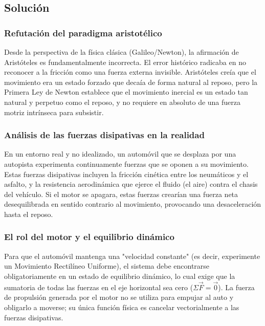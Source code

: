 \documentclass[12pt, a4paper]{article}
\begin{document}
\subsection*{Solución}

\subsubsection*{Refutación del paradigma aristotélico}
Desde la perspectiva de la física clásica (Galileo/Newton), la afirmación de Aristóteles es fundamentalmente incorrecta. El error histórico radicaba en no reconocer a la fricción como una fuerza externa invisible. Aristóteles creía que el movimiento era un estado forzado que decaía de forma natural al reposo, pero la Primera Ley de Newton establece que el movimiento inercial es un estado tan natural y perpetuo como el reposo, y no requiere en absoluto de una fuerza motriz intrínseca para subsistir.

\subsubsection*{Análisis de las fuerzas disipativas en la realidad}
En un entorno real y no idealizado, un automóvil que se desplaza por una autopista experimenta continuamente fuerzas que se oponen a su movimiento. Estas fuerzas disipativas incluyen la fricción cinética entre los neumáticos y el asfalto, y la resistencia aerodinámica que ejerce el fluido (el aire) contra el chasis del vehículo. Si el motor se apagara, estas fuerzas crearían una fuerza neta desequilibrada en sentido contrario al movimiento, provocando una desaceleración hasta el reposo.

\subsubsection*{El rol del motor y el equilibrio dinámico}
Para que el automóvil mantenga una "velocidad constante" (es decir, experimente un Movimiento Rectilíneo Uniforme), el sistema debe encontrarse obligatoriamente en un estado de equilibrio dinámico, lo cual exige que la sumatoria de todas las fuerzas en el eje horizontal sea cero ($\Sigma\vec{F} = \vec{0}$). La fuerza de propulsión generada por el motor no se utiliza para empujar al auto y obligarlo a moverse; su única función física es cancelar vectorialmente a las fuerzas disipativas.
\end{document}
